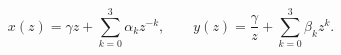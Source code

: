 \begin{equation}
    x(z)=\gamma z+\sum_{k=0}^3\alpha_kz^{-k},\qquad
    y(z)=\frac\gamma z+\sum_{k=0}^3\beta_kz^k.
    \label{eq:qtm-general-rational}
\end{equation}%
